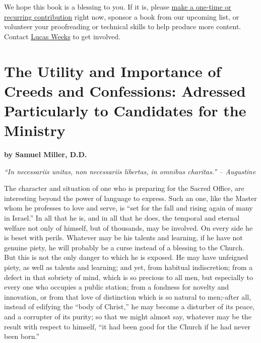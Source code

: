 \documentclass[
]{book}
\begin{document}
We hope this book is a blessing to you. If it is, please \href{https://warhornmedia.com/give}{make a one-time or recurring contribution} right now, sponsor a book from our upcoming list, or volunteer your proofreading or technical skills to help produce more content. Contact \href{mailto:lucas@beggarsborn.com}{Lucas Weeks} to get involved.

\clearpage
\setcounter{page}{1}

\hypertarget{the-utility-and-importance-of-creeds-and-confessions-adressed-particularly-to-candidates-for-the-ministry}{%
\chapter{The Utility and Importance of Creeds and Confessions: Adressed Particularly to Candidates for the Ministry}\label{the-utility-and-importance-of-creeds-and-confessions-adressed-particularly-to-candidates-for-the-ministry}}

\textbf{by Samuel Miller, D.D.}

\emph{``In necessariis unitas, non necessariis libertas, in omnibus charitas.'' -- Augustine}

The character and situation of one who is preparing for the Sacred Office, are interesting beyond the power of language to express. Such an one, like the Master whom he professes to love and serve, is ``set for the fall and rising again of many in Israel.'' In all that he is, and in all that he does, the temporal and eternal welfare not only of himself, but of thousands, may be involved. On every side he is beset with perils. Whatever may be his talents and learning, if he have not genuine piety, he will probably be a curse instead of a blessing to the Church. But this is not the only danger to which he is exposed. He may have unfeigned piety, as well as talents and learning; and yet, from habitual indiscretion; from a defect in that sobriety of mind, which is so precious to all men, but especially to every one who occupies a public station; from a fondness for novelty and innovation, or from that love of distinction which is so natural to men;-after all, instead of edifying the ``body of Christ,'' he may become a disturber of its peace, and a corrupter of its purity; so that we might almost say, whatever may be the result with respect to himself, ``it had been good for the Church if he had never been born.''
\end{document}
